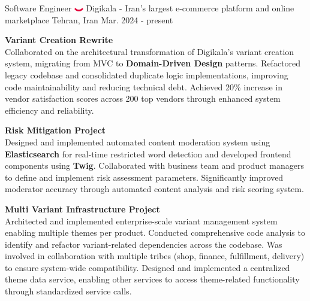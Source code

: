 

\begin{cventries}
  \cventry
    {Software Engineer} %
    {\includegraphics[width=0.03\textwidth]{images/digikala.png} Digikala - \textnormal{Iran's largest e-commerce platform and online marketplace}} %
    {Tehran, Iran} %
    {Mar. 2024 - present} %
    {
      \begin{cvitems} %
      \item \textbf{Variant Creation Rewrite}\\
      Collaborated on the architectural transformation of Digikala's variant creation system, migrating from MVC to \textbf{Domain-Driven Design} patterns. Refactored legacy codebase and consolidated duplicate logic implementations, improving code maintainability and reducing technical debt. Achieved 20\% increase in vendor satisfaction scores across 200 top vendors through enhanced system efficiency and reliability.
      \vspace{0.1cm}
      \item \textbf{Risk Mitigation Project}\\
      Designed and implemented automated content moderation system using \textbf{Elasticsearch} for real-time restricted word detection and developed frontend components using \textbf{Twig}. Collaborated with business team and product managers to define and implement risk assessment parameters. Significantly improved moderator accuracy through automated content analysis and risk scoring system.
      \vspace{0.1cm}
      \item \textbf{Multi Variant Infrastructure Project}\\
      Architected and implemented enterprise-scale variant management system enabling multiple themes per product. Conducted comprehensive code analysis to identify and refactor variant-related dependencies across the codebase. Was involved in collaboration with multiple tribes (shop, finance, fulfillment, delivery) to ensure system-wide compatibility. Designed and implemented a centralized theme data service, enabling other services to access theme-related functionality through standardized service calls.
      \end{cvitems}
    }
  \vspace{0.5cm}


\end{cventries}
